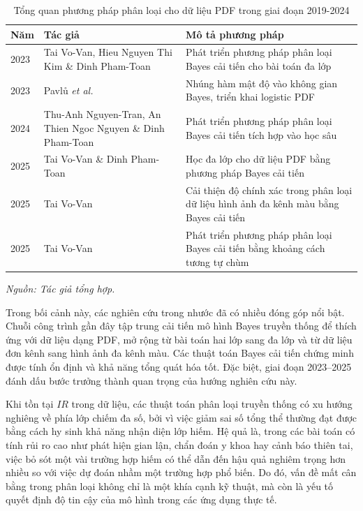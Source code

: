 \documentclass[a4paper,oneside]{book} %
\theoremstyle{plain}
\theoremstyle{plain}
\theoremstyle{nonumberplain}
\begin{document}
\begin{table}[H]
	\centering
	\fontsize{11pt}{14pt}\selectfont
	\caption{Tổng quan phương pháp phân loại cho dữ liệu PDF trong giai đoạn 2019-2024}
	\label{tab:pdf_classification_summary}
	\begin{tabular*}{\textwidth}{@{\extracolsep\fill}lp{6cm}p{8cm}@{\extracolsep\fill}}
		\toprule
		\textbf{Năm} & \textbf{Tác giả} & \textbf{Mô tả phương pháp} \\
		\midrule
		2023 & Tai Vo-Van, Hieu Nguyen Thi Kim \& Dinh Pham-Toan \cite{vovan2023multi} & Phát triển phương pháp phân loại Bayes cải tiến cho bài toán đa lớp\\
		2023 & Pavlů \textit{et al.} \cite{pavluu2023classification} & Nhúng hàm mật độ vào không gian Bayes, triển khai logistic PDF \\
		2024 & Thu-Anh Nguyen-Tran, An Thien Ngoc Nguyen \& Dinh Pham-Toan\cite{tran2025novel}& Phát triển phương pháp phân loại Bayes cải tiến tích hợp vào học sâu\\
		2025 & Tai Vo-Van \& Dinh Pham-Toan \cite{vo2024supervised} & Học đa lớp cho dữ liệu PDF bằng phương pháp Bayes cải tiến\\
		2025 & Tai Vo-Van \cite{vovan2025classifying} & Cải thiện độ chính xác trong phân loại dữ liệu hình ảnh đa kênh màu bằng Bayes cải tiến \\
		2025 & Tai Vo-Van \cite{vo2025developing} &  Phát triển phương pháp phân loại Bayes cải tiến bằng khoảng cách tương tự chùm \\
		\bottomrule
	\end{tabular*}
	\begin{minipage}{\textwidth}
		\fontsize{11pt}{14pt}\selectfont\it
		Nguồn: Tác giả tổng hợp.
	\end{minipage}
\end{table}


Trong bối cảnh này, các nghiên cứu trong nhước đã có nhiều đóng góp nổi bật. Chuỗi công trình gần đây tập trung cải tiến mô hình Bayes truyền thống để thích ứng với dữ liệu dạng PDF, mở rộng từ bài toán hai lớp sang đa lớp và từ dữ liệu đơn kênh sang hình ảnh đa kênh màu. Các thuật toán Bayes cải tiến chứng minh được tính ổn định và khả năng tổng quát hóa tốt. Đặc biệt, giai đoạn 2023--2025 đánh dấu bước trưởng thành quan trọng của hướng nghiên cứu này.



Khi tồn tại $IR$ trong dữ liệu, các thuật toán phân loại truyền thống có xu hướng nghiêng về phía lớp chiếm đa số, bởi vì việc giảm sai số tổng thể thường đạt được bằng cách hy sinh khả năng nhận diện lớp hiếm. Hệ quả là, trong các bài toán có tính rủi ro cao như phát hiện gian lận, chẩn đoán y khoa hay cảnh báo thiên tai, việc bỏ sót một vài trường hợp hiếm có thể dẫn đến hậu quả nghiêm trọng hơn nhiều so với việc dự đoán nhầm một trường hợp phổ biến. Do đó, vấn đề mất cân bằng trong phân loại không chỉ là một khía cạnh kỹ thuật, mà còn là yếu tố quyết định độ tin cậy của mô hình trong các ứng dụng thực tế.
\end{document}
